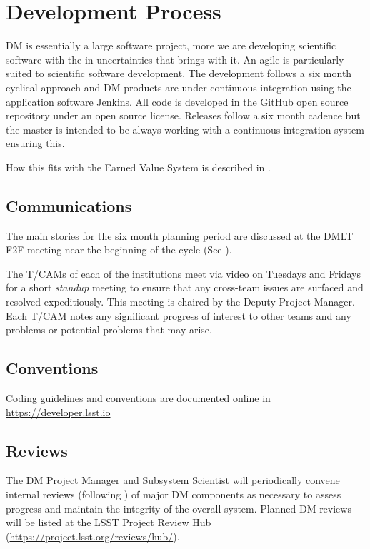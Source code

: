\section{Development Process} \label{sect:devproc}

DM is essentially a large software project, more we are developing scientific software with the in uncertainties that brings with it. 
An agile \citep{it:agile} is particularly suited to scientific software development.  The development follows a six month  cyclical approach and  DM  products are under continuous
integration using the application software Jenkins. All code is developed in the GitHub open source repository under an open source license.
Releases follow a six month cadence but the master is intended to be always working with a continuous integration system ensuring this.

How this fits with the Earned Value System is described in .


\subsection{Communications}

The main stories for the six month planning period are discussed at the DMLT F2F meeting near the beginning of the cycle (See ). 

The T/CAMs of each of the institutions meet via video on Tuesdays and Fridays for a short \emph{standup} meeting to ensure that any cross-team issues are surfaced and resolved expeditiously.
This meeting is chaired by the Deputy Project Manager.
Each T/CAM notes any significant progress of interest to other teams and any problems or potential problems that may arise.

\subsection{Conventions}
Coding guidelines and conventions are documented online in \url{https://developer.lsst.io}

\subsection{Reviews} \label{sect:reviews}

The DM Project Manager and Subsystem Scientist will periodically convene internal reviews (following ) 
of major DM components as necessary to assess progress and maintain the integrity of the overall system. Planned DM reviews will be listed at the LSST Project Review Hub (\url{https://project.lsst.org/reviews/hub/}).

